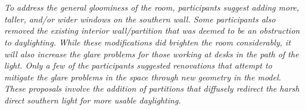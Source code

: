 \documentclass[landscape,20pt]{sciposter}
\begin{document}
\begin{minipage}[t]{17in}
\begin{tabular}{lc}
\end{tabular}

\vspace{-4.6in}
\hspace{.5in}
\begin{minipage}{0.158\textwidth}~{\color{white}{\bf A1 original}}\end{minipage} 
\begin{minipage}{0.158\textwidth}~{\color{white}{\bf A1 renovation}}\end{minipage}
%
\begin{minipage}{0.158\textwidth}~{\color{white}{\bf N6 original}}\end{minipage} 
\begin{minipage}{0.158\textwidth}~{\color{white}{\bf N6 renovation}}\end{minipage} 
\begin{minipage}{0.158\textwidth}~{\color{white}{\bf A3 original}}\end{minipage} 
\begin{minipage}{0.158\textwidth}~{\color{white}{\bf A3 renovation}}\end{minipage}
%
\vspace{4.1in}
{\em \\To address the general gloominess of the room, participants
  suggest adding more, taller, and/or wider windows on the southern
  wall.  Some participants also
  removed the existing interior wall/partition that was deemed to be
  an obstruction to daylighting.  While these modifications did
  brighten the room considerably, it will also increase the glare
  problems for those working at desks in the path of the light.
  Only a few of the participants suggested renovations that
  attempt to mitigate the glare problems in the space through new
  geometry in the model.  These proposals involve the addition of
  partitions that diffusely redirect the harsh direct southern light
  for more usable daylighting.
}



\label{FIGURE_results_changing_time}
\vspace{-6in}
\end{minipage}
\end{document}
